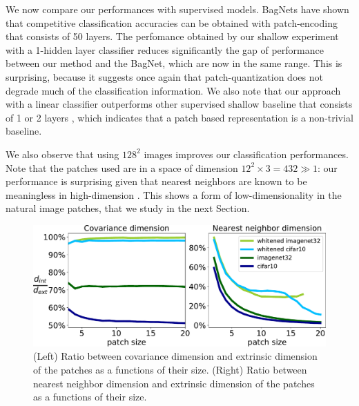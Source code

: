 \documentclass{article}
\begin{document}
We now compare our performances with supervised models. BagNets \citep{brendel2019approximating} have shown that  competitive classification accuracies can be obtained with patch-encoding that consists of 50 layers.
The perfomance obtained by our shallow experiment with a 1-hidden layer classifier reduces significantly the gap of performance between our method and the BagNet, which are now in the same range. This is surprising, because it suggests once again that patch-quantization does not degrade much of the classification information. We also note that our approach with a linear classifier outperforms other supervised shallow baseline that consists of 1 or 2 layers \citep{belilovsky2018greedy}, which indicates that a patch based representation is a non-trivial baseline.

We also observe that using $128^2$ images improves our classification performances.
Note that the patches used are in a space of dimension $12^2 \times 3 = 432 \gg 1$:  our performance is surprising given that  nearest neighbors are known to be meaningless in high-dimension \citep{beyer1999nearest}.
This shows a form of low-dimensionality in the natural image patches, that we study in the next Section.




\begin{figure}\label{fig:intrinsic_dim}\center
	\includegraphics[width=.76\linewidth]{figures/intrinsic_dims}
	\caption{(Left) Ratio between covariance dimension and extrinsic dimension of the patches as a functions of their size. (Right) Ratio between nearest neighbor dimension and extrinsic dimension of the patches as a functions of their size.}
\end{figure}

\end{document}
